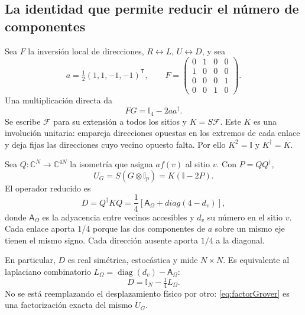 \documentclass[11pt,a4paper]{article}
\newcommand{\Id}{\mathbb I}
\newcommand{\diag}{\operatorname{diag}}
\numberwithin{equation}{section}
\begin{document}
\subsection{La identidad que permite reducir el número de componentes}
Sea $F$ la inversión local de direcciones, $R\leftrightarrow L$, $U\leftrightarrow D$, y sea
\begin{equation}
 a=\tfrac12(1,1,-1,-1)^{\mathsf T},\qquad
 F=\begin{pmatrix}0&1&0&0\\1&0&0&0\\0&0&0&1\\0&0&1&0\end{pmatrix}.
\end{equation}
Una multiplicación directa da
\begin{equation}\label{eq:key}
 \boxed{FG=\Id_4-2aa^\dagger.}
\end{equation}
Se escribe $\mathcal F$ para su extensión a todos los sitios y $K=S\mathcal F$. Este $K$ es una involución unitaria: empareja direcciones opuestas en los extremos de cada enlace y deja fijas las direcciones cuyo vecino opuesto falta. Por ello $K^2=\Id$ y $K^\dagger=K$.

Sea $Q:\mathbb C^N\to\mathbb C^{4N}$ la isometría que asigna $a f(v)$ al sitio $v$. Con $P=QQ^\dagger$,
\begin{equation}\label{eq:factorGrover}
 U_G=S(G\otimes\Id_p)=K(\Id-2P).
\end{equation}
El operador reducido es
\begin{equation}\label{eq:discriminant}
 D=Q^\dagger KQ
 =\frac14\left[\mathsf A_\Omega+diag(4-d_v)\right],
\end{equation}
donde $\mathsf A_\Omega$ es la adyacencia entre vecinos accesibles y $d_v$ su número en el sitio $v$. Cada enlace aporta $1/4$ porque las dos componentes de $a$ sobre un mismo eje tienen el mismo signo. Cada dirección ausente aporta $1/4$ a la diagonal.

En particular, $D$ es real simétrica, estocástica y mide $N\times N$. Es equivalente al laplaciano combinatorio $L_\Omega=\diag(d_v)-\mathsf A_\Omega$:
\begin{equation}\label{eq:laplacian}
 \boxed{D=\Id_N-\tfrac14L_\Omega.}
\end{equation}
No se está reemplazando el desplazamiento físico por otro: \eqref{eq:factorGrover} es una factorización exacta del mismo $U_G$.
\end{document}
